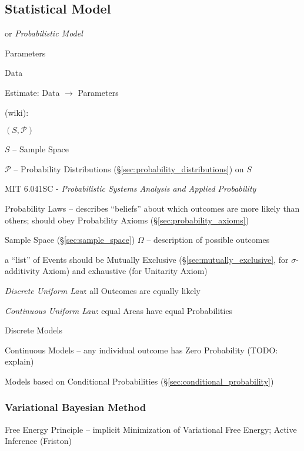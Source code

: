 \subsection{Statistical Model}\label{sec:statistical_model}

or \emph{Probabilistic Model}

Parameters

Data

Estimate: Data $\rightarrow$ Parameters

(wiki):

$(S, \mathcal{P})$

$S$ -- Sample Space

$\mathcal{P}$ -- Probability Distributions
(\S\ref{sec:probability_distributions}) on $S$

\asterism

MIT 6.041SC - \emph{Probabilistic Systems Analysis and Applied Probability}

Probability Laws -- describes ``beliefs'' about which outcomes are more likely
than others; should obey Probability Axioms (\S\ref{sec:probability_axioms})

Sample Space (\S\ref{sec:sample_space}) $\Omega$ -- description of possible
outcomes

a ``list'' of Events should be Mutually Exclusive
(\S\ref{sec:mutually_exclusive}, for $\sigma$-additivity Axiom) and exhaustive
(for Unitarity Axiom)

\emph{Discrete Uniform Law}: all Outcomes are equally likely

\emph{Continuous Uniform Law}: equal Areas have equal Probabilities

Discrete Models

Continuous Models -- any individual outcome has Zero Probability (TODO: explain)

Models based on Conditional Probabilities (\S\ref{sec:conditional_probability})



\subsubsection{Variational Bayesian Method}
\label{sec:variational_bayesian_method}

Free Energy Principle -- implicit Minimization of Variational Free Energy;
Active Inference (Friston)



